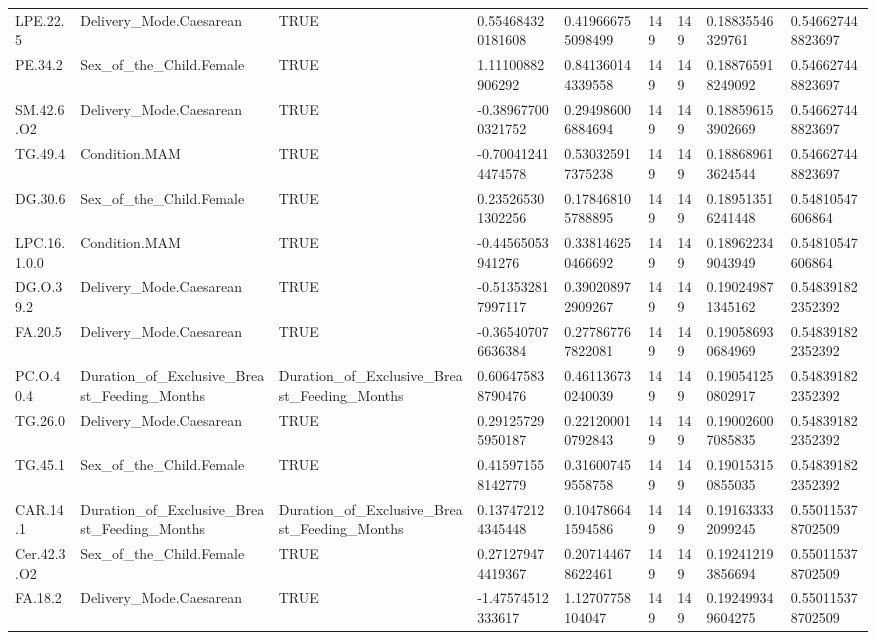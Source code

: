 \begin{longtable}{lllllllll}
LPE.22.5 & Delivery\_Mode.Caesarean & TRUE & 0.554684320181608 & 0.419666755098499 & 149 & 149 & 0.18835546329761 & 0.546627448823697 \\
PE.34.2 & Sex\_of\_the\_Child.Female & TRUE & 1.11100882906292 & 0.841360144339558 & 149 & 149 & 0.188765918249092 & 0.546627448823697 \\
SM.42.6.O2 & Delivery\_Mode.Caesarean & TRUE & -0.389677000321752 & 0.294986006884694 & 149 & 149 & 0.188596153902669 & 0.546627448823697 \\
TG.49.4 & Condition.MAM & TRUE & -0.700412414474578 & 0.530325917375238 & 149 & 149 & 0.188689613624544 & 0.546627448823697 \\
DG.30.6 & Sex\_of\_the\_Child.Female & TRUE & 0.235265301302256 & 0.178468105788895 & 149 & 149 & 0.189513516241448 & 0.54810547606864 \\
LPC.16.1.0.0 & Condition.MAM & TRUE & -0.44565053941276 & 0.338146250466692 & 149 & 149 & 0.189622349043949 & 0.54810547606864 \\
DG.O.39.2 & Delivery\_Mode.Caesarean & TRUE & -0.513532817997117 & 0.390208972909267 & 149 & 149 & 0.190249871345162 & 0.548391822352392 \\
FA.20.5 & Delivery\_Mode.Caesarean & TRUE & -0.365407076636384 & 0.277867767822081 & 149 & 149 & 0.190586930684969 & 0.548391822352392 \\
PC.O.40.4 & Duration\_of\_Exclusive\_Breast\_Feeding\_Months & Duration\_of\_Exclusive\_Breast\_Feeding\_Months & 0.606475838790476 & 0.461136730240039 & 149 & 149 & 0.190541250802917 & 0.548391822352392 \\
TG.26.0 & Delivery\_Mode.Caesarean & TRUE & 0.291257295950187 & 0.221200010792843 & 149 & 149 & 0.190026007085835 & 0.548391822352392 \\
TG.45.1 & Sex\_of\_the\_Child.Female & TRUE & 0.415971558142779 & 0.316007459558758 & 149 & 149 & 0.190153150855035 & 0.548391822352392 \\
CAR.14.1 & Duration\_of\_Exclusive\_Breast\_Feeding\_Months & Duration\_of\_Exclusive\_Breast\_Feeding\_Months & 0.137472124345448 & 0.104786641594586 & 149 & 149 & 0.191633332099245 & 0.550115378702509 \\
Cer.42.3.O2 & Sex\_of\_the\_Child.Female & TRUE & 0.271279474419367 & 0.207144678622461 & 149 & 149 & 0.192412193856694 & 0.550115378702509 \\
FA.18.2 & Delivery\_Mode.Caesarean & TRUE & -1.47574512333617 & 1.12707758104047 & 149 & 149 & 0.192499349604275 & 0.550115378702509 \\

\end{longtable}
